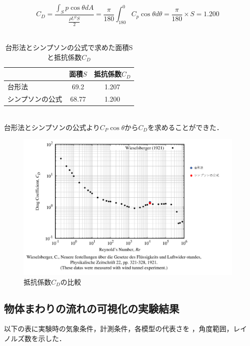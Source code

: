 \documentclass[a4paper,titlepage]{ltjsarticle}
\begin{document}
\begin{equation}
  C_D=\frac{\int _Sp\cos \theta dA}{\frac{\rho U^2S}{2}}=\frac{\pi}{180}\int_{180}^{0} C_p\cos \theta d\theta 
  \label{cd2}=\frac{\pi}{180}\times S=1.200
\end{equation}
\\
\begin{table}[hbtp]
  \caption{台形法とシンプソンの公式で求めた面積Sと抵抗係数$C_D$}
  \centering
  \begin{tabular}{lcc}
    \toprule
    &面積$S$&抵抗係数$C_D$\\
    \hline
    台形法&69.2&1.207\\
    シンプソンの公式&68.77&1.200\\
    \bottomrule
  \end{tabular}
\end{table}
\\
台形法とシンプソンの公式より$C_P\cos\theta$から$C_D$を求めることができた．
\begin{figure}[hbtp]
  \centering
  \includegraphics[width=15cm]{図9.png}
  \caption{抵抗係数$C_D$の比較}
  \label{}
\end{figure}

\clearpage

\subsection{物体まわりの流れの可視化の実験結果}
以下の表に実験時の気象条件，計測条件，各模型の代表さを
，角度範囲，レイノルズ数を示した．
\end{document}
